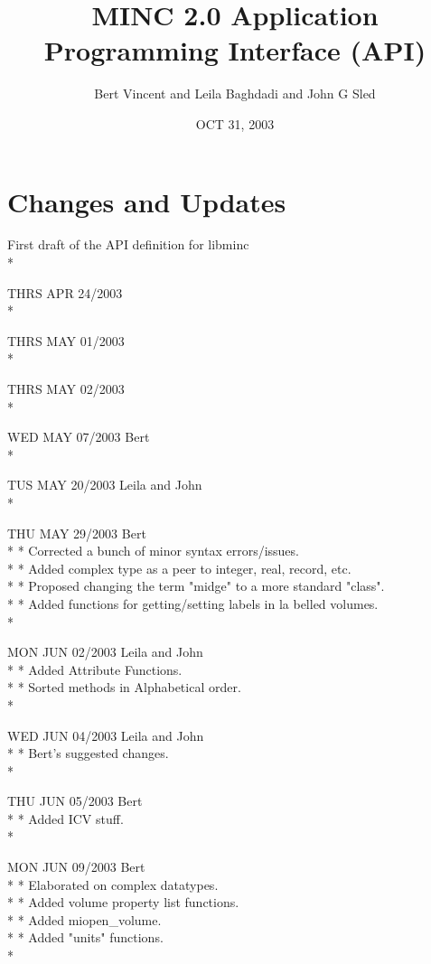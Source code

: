 \documentclass{article}
\title{MINC 2.0 Application Programming Interface (API)}
\author{Bert Vincent and Leila Baghdadi and John G Sled}
\date{OCT 31, 2003}
\begin{document}
\maketitle

\tableofcontents

\clearpage

\section{Changes and Updates}

First draft of the API definition for libminc\\*

THRS APR 24/2003\\*

THRS MAY 01/2003\\*

THRS MAY 02/2003\\*

WED  MAY 07/2003 Bert\\*

TUS  MAY 20/2003 Leila and John\\*

THU  MAY 29/2003 Bert\\*
* Corrected a bunch of minor syntax errors/issues.\\*
* Added complex type as a peer to integer, real, record, etc.\\*
* Proposed changing the term "midge" to a more standard "class".\\*
* Added functions for getting/setting labels in la belled volumes.\\*

MON  JUN 02/2003 Leila and John\\*
* Added Attribute Functions.\\*
* Sorted methods in Alphabetical order.\\*

WED  JUN 04/2003 Leila and John\\*
* Bert's suggested changes.\\*

THU  JUN 05/2003 Bert\\*
* Added ICV stuff.\\*

MON  JUN 09/2003 Bert\\*
* Elaborated on complex datatypes.\\*
* Added volume property list functions.\\*
* Added miopen\_volume.\\*
* Added "units" functions.\\*
\end{document}
